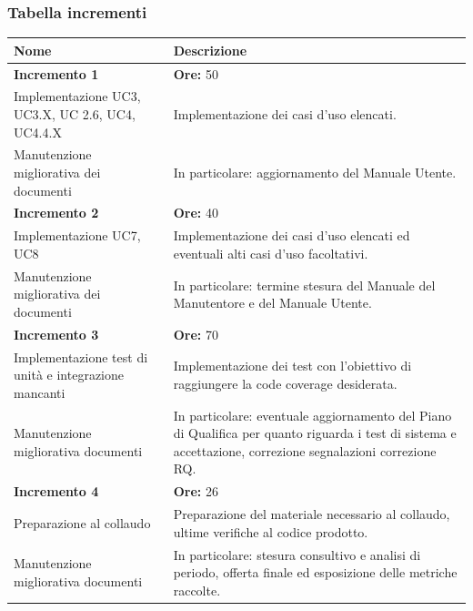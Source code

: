	\subsubsection{Tabella incrementi}
	\begin{longtabu} to \textwidth{| X[0.2, c m] | X[0.4, l m ] |}
		\hline
		\textbf{Nome} & \textbf{Descrizione} \\ 
	 \hline
		 \textbf{Incremento 1} & \textbf{Ore:} 50 \\
	 \hline
	 	Implementazione UC3, UC3.X, UC 2.6, UC4, UC4.4.X &
		Implementazione dei casi d'uso elencati. \\
	 \hline
		Manutenzione migliorativa dei documenti &
		In particolare: aggiornamento del Manuale Utente. \\
	 \hline
		 \textbf{Incremento 2} & \textbf{Ore:} 40 \\
	 \hline
	 	Implementazione UC7, UC8 &
		Implementazione dei casi d'uso elencati ed eventuali alti casi d'uso facoltativi. \\
	 \hline
		Manutenzione migliorativa dei documenti &
		In particolare: termine stesura del Manuale del Manutentore e del Manuale Utente. \\
	 \hline
	 	\textbf{Incremento 3} & \textbf{Ore:} 70 \\
	 \hline
		Implementazione test di unità e integrazione mancanti &
		Implementazione dei test con l'obiettivo di raggiungere la code coverage desiderata. \\
	 \hline
		 Manutenzione migliorativa documenti &
		 In particolare: eventuale aggiornamento del Piano di Qualifica per quanto riguarda i test di sistema e accettazione, correzione segnalazioni correzione RQ. \\
	 \hline
	 \textbf{Incremento 4} & \textbf{Ore:} 26\\
	 \hline
		 Preparazione al collaudo &
		 Preparazione del materiale necessario al collaudo, ultime verifiche al codice prodotto. \\
	 \hline
		 Manutenzione migliorativa documenti &
		 In particolare: stesura consultivo e analisi di periodo, offerta finale ed esposizione delle metriche raccolte. \\
	 \hline
 \end{longtabu}
